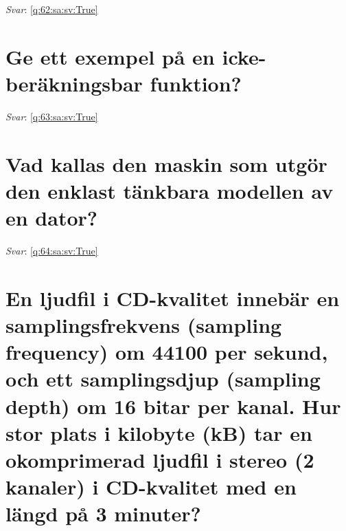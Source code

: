 \documentclass[a4paper,11pt,oneside]{book}
\begin{document}
\begin{sloppypar}
\label{q:62:sa:sv:False}

\vspace{2cm}

\noindent\makebox[\textwidth]{\hrulefill}

\vspace{1cm}

\textit{Svar}: \autoref{q:62:sa:sv:True}



\section{Ge ett exempel p\r{a} en icke-ber\"akningsbar funktion?}

\label{q:63:sa:sv:False}

\vspace{2cm}

\noindent\makebox[\textwidth]{\hrulefill}

\vspace{1cm}

\textit{Svar}: \autoref{q:63:sa:sv:True}



\section{Vad kallas den maskin som utg\"or den enklast t\"ankbara modellen av en dator?}

\label{q:64:sa:sv:False}

\vspace{2cm}

\noindent\makebox[\textwidth]{\hrulefill}

\vspace{1cm}

\textit{Svar}: \autoref{q:64:sa:sv:True}



\section{En ljudfil i CD-kvalitet inneb\"ar en samplingsfrekvens (sampling frequency) om 44100 per sekund, och ett samplingsdjup (sampling depth) om 16 bitar per kanal. Hur stor plats i kilobyte (kB) tar en okomprimerad ljudfil i stereo (2 kanaler) i CD-kvalitet med en l\"angd p\r{a} 3 minuter?}

\label{q:65:sa:sv:False}

\vspace{2cm}

\noindent\makebox[\textwidth]{\hrulefill}


\end{sloppypar}
\end{document}
